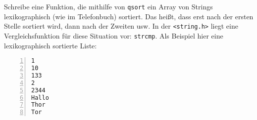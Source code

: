 \begin{aufg} Schreibe eine Funktion, die mithilfe von \verb|qsort| ein Array von Strings lexikographisch (wie im Telefonbuch) sortiert. Das heißt, dass erst nach der ersten Stelle sortiert wird, dann nach der Zweiten usw. In der \verb|<string.h>| liegt eine Vergleichsfunktion für diese Situation vor: \verb|strcmp|. Als Beispiel hier eine lexikographisch sortierte Liste:
\begin{codelisting}
\begin{lstlisting}[numbers=left,numberstyle=\tiny,frame=tlrb]
1
10
133
2
2344
Hallo
Thor
Tor
\end{lstlisting}
\end{codelisting}
\end{aufg}
